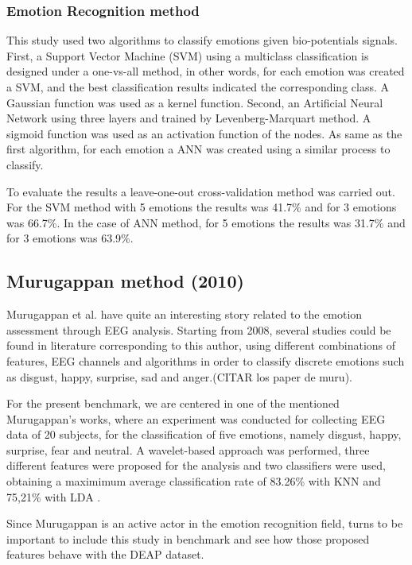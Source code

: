 \documentclass{sig-alternate}
\begin{document}
\subsubsection{Emotion Recognition method}

This study used two algorithms to classify emotions given bio-potentials signals.
First, a Support Vector Machine (SVM) using a multiclass classification is designed under 
a one-vs-all method, in other words, for each emotion was created a SVM, and the best
classification results indicated the corresponding class. A Gaussian function was used as a kernel function.
Second, an Artificial Neural Network using three layers and trained by Levenberg-Marquart method.
A sigmoid function was used as an activation function of the nodes. As same as the first algorithm,
for each emotion a ANN was created using a similar process to classify.

To evaluate the results a leave-one-out cross-validation method was carried out. 
For the SVM method with 5 emotions the results was 41.7\% and for 3 emotions was 66.7\%.
In the case of ANN method, for 5 emotions the results was 31.7\% and for 3 emotions was
63.9\%.   

\subsection{Murugappan method (2010)}	

Murugappan et al. have quite an interesting story related to the emotion assessment through EEG analysis. Starting from 2008, several studies could be found in literature corresponding to this author, using different combinations of features, EEG channels and algorithms in order to classify discrete emotions such as disgust, happy, surprise, sad and anger.(CITAR los paper de muru).

For the present benchmark, we are centered in one of the mentioned Murugappan's works, where an experiment was conducted for collecting EEG data of 20 subjects, for the classification of five emotions, namely disgust, happy, surprise, fear and neutral. A wavelet-based approach was performed, three different features were proposed for the analysis and two classifiers were used, obtaining a maximimum average classification rate of 83.26\% with KNN and 75,21\% with LDA \cite{Murugappan2010Classification}.

Since Murugappan is an active actor in the emotion recognition field, turns to be important to include this study in benchmark and see how those proposed features behave with the DEAP dataset.
\end{document}

